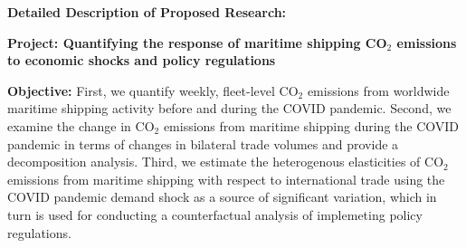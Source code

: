 \documentclass[hidelinks, 12pt,letterpaper]{article}
\begin{document}




\begin{center}
\textbf{Detailed Description of Proposed Research: }\vspace{-0.25cm}
\end{center}

\noindent \textbf{Project: Quantifying the response of maritime shipping CO$_2$ emissions to economic shocks and policy regulations}
\smallskip

\noindent \textbf{Objective:} First, we quantify weekly, fleet-level CO$_2$ emissions from worldwide maritime shipping activity before and during the COVID pandemic.
Second, we examine the change in CO$_2$ emissions from maritime shipping during the COVID pandemic in terms of changes in bilateral trade volumes and provide a decomposition analysis. 
Third, we estimate the heterogenous elasticities of CO$_2$ emissions from maritime shipping with respect to international trade using the COVID pandemic demand shock as a source of significant variation, which in turn is used for conducting a counterfactual analysis of implemeting policy regulations.
\smallskip
\end{document}
